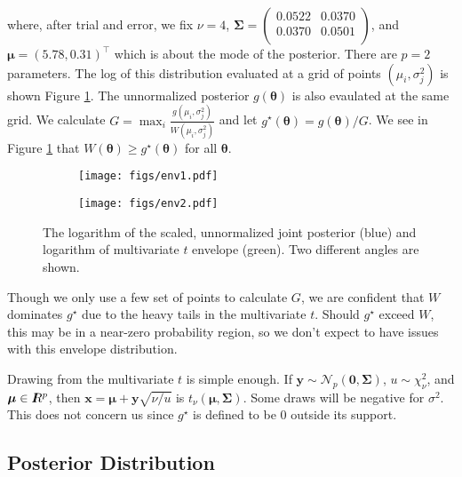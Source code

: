\documentclass[12pt]{article}
\newcommand{\m}[1]{\mathbf{\bm{#1}}}
\newcommand{\R}{I\hspace{-4.4pt}R}
\begin{document}
\noindent where, after trial and error, we fix $\nu = 4$, $\m{\Sigma} = \left(\begin{array}{ll} 0.0522 & 0.0370 \\ 0.0370 & 0.0501 \\ \end{array}\right)$, and $\m{\mu}=(5.78, 0.31)^\top$ which is about the mode of the posterior. There are $p=2$ parameters. The log of this distribution evaluated at a grid of points $(\mu_i, \sigma^2_j)$ is shown Figure \ref{envelope}. The unnormalized posterior $g(\m{\theta})$ is also evaulated at the same grid. We calculate $G=\max_i\frac{g(\mu_i,\sigma^2_j)}{W(\mu_i,\sigma^2_j)}$ and let $g^\star(\m{\theta}) = g(\m{\theta})/G$. We see in Figure \ref{envelope} that $W(\m{\theta})\geq g^\star(\m{\theta})$ for all $\m{\theta}$.
\bigskip

\begin{figure}
    \centering
    \begin{subfigure}{.5\textwidth}
        \centering
        \texttt{[image: figs/env1.pdf]}
    \end{subfigure}%
    \begin{subfigure}{.5\textwidth}
        \centering
        \texttt{[image: figs/env2.pdf]}
    \end{subfigure}
    \caption{The logarithm of the scaled, unnormalized joint posterior (blue) and logarithm of multivariate $t$ envelope (green). Two different angles are shown.}
    \label{envelope}
\end{figure}

\noindent Though we only use a few set of points to calculate $G$, we are confident that $W$ dominates $g^\star$ due to the heavy tails in the multivariate $t$. Should $g^\star$ exceed $W$, this may be in a near-zero probability region, so we don't expect to have issues with this envelope distribution.
\bigskip

\noindent Drawing from the multivariate $t$ is simple enough. If $\m{y}\sim\mathcal{N}_p(\m{0},\m{\Sigma})$, $u\sim\chi^2_\nu$, and $\m{\mu}\in\R^p$, then $\m{x}=\m{\mu}+\m{y}\sqrt{\nu/u}$ is $t_\nu(\m{\mu},\m{\Sigma})$. Some draws will be negative for $\sigma^2$. This does not concern us since $g^\star$ is defined to be $0$ outside its support.

\subsection{Posterior Distribution}
\end{document}
